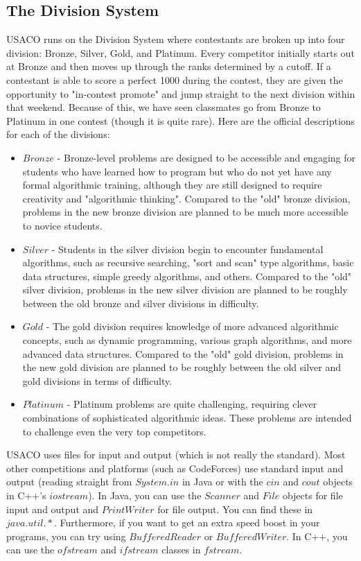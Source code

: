 \documentclass{article}
\begin{document}
\subsection{The Division System}
USACO runs on the Division System where contestants are broken up into four division: Bronze, Silver, Gold, and Platinum. Every competitor initially starts out at Bronze and then moves up through the ranks determined by a cutoff. If a contestant is able to score a perfect 1000 during the contest, they are given the opportunity to "in-contest promote" and jump straight to the next division within that weekend. Because of this, we have seen classmates go from Bronze to Platinum in one contest (though it is quite rare). Here are the official descriptions for each of the divisions:
\begin{itemize}
\item $Bronze$ - Bronze-level problems are designed to be accessible and engaging for students who have learned how to program but who do not yet have any formal algorithmic training, although they are still designed to require creativity and "algorithmic thinking".  Compared to the "old" bronze division, problems in the new bronze division are planned to be much more accessible to novice students.
\item $Silver$ - Students in the silver division begin to encounter fundamental algorithms, such as recursive searching, "sort and scan" type algorithms, basic data structures, simple greedy algorithms, and others.  Compared to the "old" silver division, problems in the new silver division are planned to be roughly between the old bronze and silver divisions in difficulty.
\item $Gold$ - The gold division requires knowledge of more advanced algorithmic concepts, such as dynamic programming, various graph algorithms, and more advanced data structures.  Compared to the "old" gold division, problems in the new gold division are planned to be roughly between the old silver and gold divisions in terms of difficulty.
\item $Platinum$ - Platinum problems are quite challenging, requiring clever combinations of sophisticated algorithmic ideas.  These problems are intended to challenge even the very top competitors.
\end{itemize}

USACO uses files for input and output (which is not really the standard). Most other competitions and platforms (such as CodeForces) use standard input and output (reading straight from $System.in$ in Java or with the $cin$ and $cout$ objects in C++'s $iostream$). In Java, you can use the $Scanner$ and $File$ objects for file input and output and $PrintWriter$ for file output. You can find these in $java.util.*$. Furthermore, if you want to get an extra speed boost in your programs, you can try using $BufferedReader$ or $BufferedWriter$. In C++, you can use the $ofstream$ and $ifstream$ classes in $fstream$.
\end{document}
